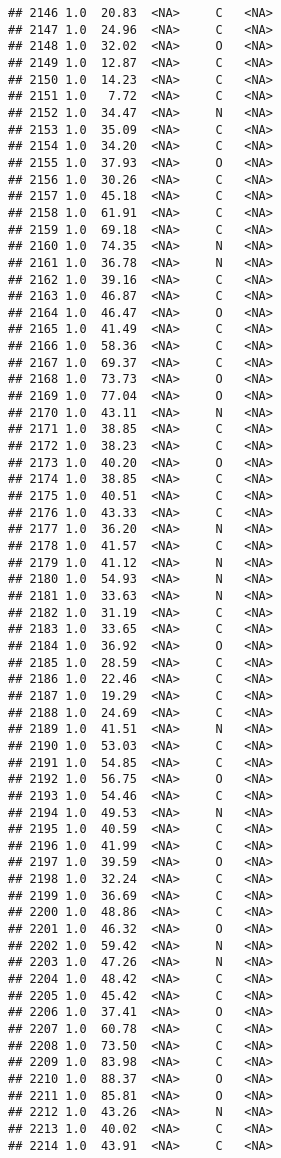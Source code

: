 \documentclass[
]{article}
\begin{document}
\begin{verbatim}
## 2146 1.0  20.83  <NA>     C   <NA>
## 2147 1.0  24.96  <NA>     C   <NA>
## 2148 1.0  32.02  <NA>     O   <NA>
## 2149 1.0  12.87  <NA>     C   <NA>
## 2150 1.0  14.23  <NA>     C   <NA>
## 2151 1.0   7.72  <NA>     C   <NA>
## 2152 1.0  34.47  <NA>     N   <NA>
## 2153 1.0  35.09  <NA>     C   <NA>
## 2154 1.0  34.20  <NA>     C   <NA>
## 2155 1.0  37.93  <NA>     O   <NA>
## 2156 1.0  30.26  <NA>     C   <NA>
## 2157 1.0  45.18  <NA>     C   <NA>
## 2158 1.0  61.91  <NA>     C   <NA>
## 2159 1.0  69.18  <NA>     C   <NA>
## 2160 1.0  74.35  <NA>     N   <NA>
## 2161 1.0  36.78  <NA>     N   <NA>
## 2162 1.0  39.16  <NA>     C   <NA>
## 2163 1.0  46.87  <NA>     C   <NA>
## 2164 1.0  46.47  <NA>     O   <NA>
## 2165 1.0  41.49  <NA>     C   <NA>
## 2166 1.0  58.36  <NA>     C   <NA>
## 2167 1.0  69.37  <NA>     C   <NA>
## 2168 1.0  73.73  <NA>     O   <NA>
## 2169 1.0  77.04  <NA>     O   <NA>
## 2170 1.0  43.11  <NA>     N   <NA>
## 2171 1.0  38.85  <NA>     C   <NA>
## 2172 1.0  38.23  <NA>     C   <NA>
## 2173 1.0  40.20  <NA>     O   <NA>
## 2174 1.0  38.85  <NA>     C   <NA>
## 2175 1.0  40.51  <NA>     C   <NA>
## 2176 1.0  43.33  <NA>     C   <NA>
## 2177 1.0  36.20  <NA>     N   <NA>
## 2178 1.0  41.57  <NA>     C   <NA>
## 2179 1.0  41.12  <NA>     N   <NA>
## 2180 1.0  54.93  <NA>     N   <NA>
## 2181 1.0  33.63  <NA>     N   <NA>
## 2182 1.0  31.19  <NA>     C   <NA>
## 2183 1.0  33.65  <NA>     C   <NA>
## 2184 1.0  36.92  <NA>     O   <NA>
## 2185 1.0  28.59  <NA>     C   <NA>
## 2186 1.0  22.46  <NA>     C   <NA>
## 2187 1.0  19.29  <NA>     C   <NA>
## 2188 1.0  24.69  <NA>     C   <NA>
## 2189 1.0  41.51  <NA>     N   <NA>
## 2190 1.0  53.03  <NA>     C   <NA>
## 2191 1.0  54.85  <NA>     C   <NA>
## 2192 1.0  56.75  <NA>     O   <NA>
## 2193 1.0  54.46  <NA>     C   <NA>
## 2194 1.0  49.53  <NA>     N   <NA>
## 2195 1.0  40.59  <NA>     C   <NA>
## 2196 1.0  41.99  <NA>     C   <NA>
## 2197 1.0  39.59  <NA>     O   <NA>
## 2198 1.0  32.24  <NA>     C   <NA>
## 2199 1.0  36.69  <NA>     C   <NA>
## 2200 1.0  48.86  <NA>     C   <NA>
## 2201 1.0  46.32  <NA>     O   <NA>
## 2202 1.0  59.42  <NA>     N   <NA>
## 2203 1.0  47.26  <NA>     N   <NA>
## 2204 1.0  48.42  <NA>     C   <NA>
## 2205 1.0  45.42  <NA>     C   <NA>
## 2206 1.0  37.41  <NA>     O   <NA>
## 2207 1.0  60.78  <NA>     C   <NA>
## 2208 1.0  73.50  <NA>     C   <NA>
## 2209 1.0  83.98  <NA>     C   <NA>
## 2210 1.0  88.37  <NA>     O   <NA>
## 2211 1.0  85.81  <NA>     O   <NA>
## 2212 1.0  43.26  <NA>     N   <NA>
## 2213 1.0  40.02  <NA>     C   <NA>
## 2214 1.0  43.91  <NA>     C   <NA>

\end{verbatim}
\end{document}
